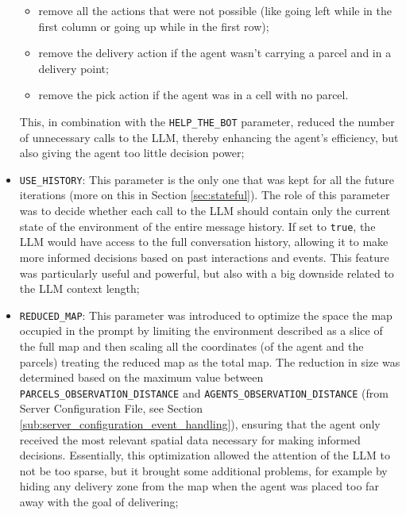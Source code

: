 \begin{itemize}
\begin{itemize}
      \item remove all the actions that were not possible (like going left while
        in the first column or going up while in the first row);

      \item remove the delivery action if the agent wasn't carrying a parcel and
        in a delivery point;

      \item remove the pick action if the agent was in a cell with no parcel.
    \end{itemize}
    This, in combination with the \texttt{HELP\_THE\_BOT} parameter, reduced the
    number of unnecessary calls to the LLM, thereby enhancing the agent's
    efficiency, but also giving the agent too little decision power;

  \item \texttt{USE\_HISTORY}: This parameter is the only one that was kept for all
    the future iterations (more on this in Section \ref{sec:stateful}). The role
    of this parameter was to decide whether each call to the LLM should contain
    only the current state of the environment of the entire message history. If set
    to \texttt{true}, the LLM would have access to the full conversation history,
    allowing it to make more informed decisions based on past interactions and
    events. This feature was particularly useful and powerful, but also with a
    big downside related to the LLM context length;

  \item \texttt{REDUCED\_MAP}: This parameter was introduced to optimize the space
    the map occupied in the prompt by limiting the environment described as a slice
    of the full map and then scaling all the coordinates (of the agent and the
    parcels) treating the reduced map as the total map. The reduction in size
    was determined based on the maximum value between \texttt{PARCELS\_OBSERVATION\_DISTANCE}
    and \texttt{AGENTS\_OBSERVATION\_DISTANCE} (from Server Configuration File,
    see Section \ref{sub:server_configuration_event_handling}), ensuring that
    the agent only received the most relevant spatial data necessary for making
    informed decisions. Essentially, this optimization allowed the attention of
    the LLM to not be too sparse, but it brought some additional problems, for
    example by hiding any delivery zone from the map when the agent was placed
    too far away with the goal of delivering;


\end{itemize}
